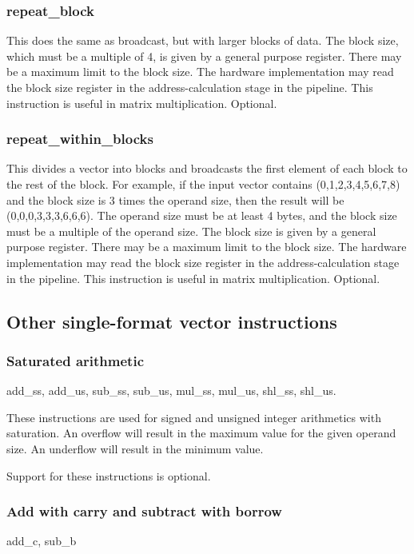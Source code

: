 \documentclass[forwardcom.tex]{subfiles}
\begin{document}
\subsubsection{repeat\_block}
This does the same as broadcast, but with larger blocks of data. The block size, which must be a multiple of 4, is given by a general purpose register. There may be a maximum limit to the block size. The hardware implementation may read the block size register in the address-calculation stage in the pipeline. 
This instruction is useful in matrix multiplication. Optional.

\subsubsection{repeat\_within\_blocks}
This divides a vector into blocks and broadcasts the first element of each block to the rest of the block. For example, if the input vector contains (0,1,2,3,4,5,6,7,8) and the block size is 3 times the operand size, then the result will be (0,0,0,3,3,3,6,6,6).
The operand size must be at least 4 bytes, and the block size must be a multiple of the operand size. The block size is given by a general purpose register. There may be a maximum limit to the block size. The hardware implementation may read the block size register in the address-calculation stage in the pipeline. This instruction is useful in matrix multiplication. Optional.

\vspace{2mm}
\subsection{Other single-format vector instructions}

\subsubsection{Saturated arithmetic} \label{saturatedArithmeticInstructions}
add\_ss, add\_us, sub\_ss, sub\_us, mul\_ss, mul\_us, shl\_ss, shl\_us.
\vspace{2mm}

These instructions are used for signed and unsigned integer arithmetics with saturation. An overflow will result in the maximum value for the given operand size. An underflow will result in the minimum value.
\vspace{2mm}

Support for these instructions is optional.

\subsubsection{Add with carry and subtract with borrow} \label{addWithCarryInstruction}
add\_c, sub\_b
\vspace{2mm}
\end{document}

